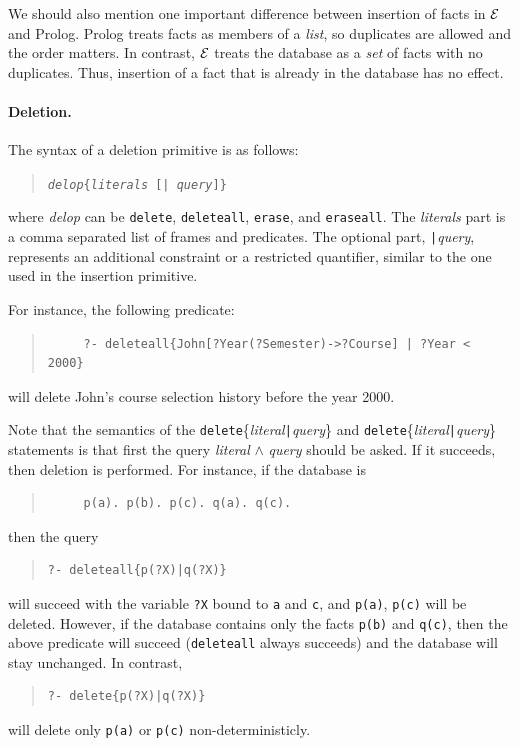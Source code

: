 \documentclass[11pt]{article}
\newcommand{\ERGO}{\mbox{\ensuremath{\cal{E}}\smaller{{\sc{RGO}}}}\xspace}
\newcommand{\FLSYSTEM}{\ERGO}
\begin{document}
We should also mention one important difference between insertion of facts
in \FLSYSTEM and Prolog. Prolog treats facts as members of a \emph{list}, so
duplicates are allowed and the order matters. In contrast, \FLSYSTEM treats
the database as a \emph{set} of facts with no duplicates. Thus, insertion
of a fact that is already in the database has no effect.


%
\paragraph{Deletion.} The syntax of a deletion primitive is as follows:
\begin{quote}
{\tt \emph{delop}\{\emph{literals} [| \emph{query}]\}}
\end{quote}
where {\it delop} can be {\tt delete}, {\tt deleteall}, {\tt erase}, and
{\tt eraseall}. The {\it literals} part is a comma separated list of
frames and predicates. The optional part, {\tt |}\emph{query},
represents an additional constraint or a restricted quantifier, similar
to the one used in the insertion primitive.

For instance, the following predicate:
\begin{quote}
\begin{verbatim}
     ?- deleteall{John[?Year(?Semester)->?Course] | ?Year < 2000}
\end{verbatim}
\end{quote}
will delete John's course selection history before the year 2000.

Note that the semantics of the {\tt delete}\{\emph{literal}{\tt |}{\it query}\}
and {\tt delete}\{\emph{literal}{\tt |}{\it query}\}
statements is that first the query \emph{literal} $\wedge$ \emph{query} should
be asked. If it succeeds, then deletion is performed. For instance, if the
database is
\begin{quote}
\begin{verbatim}
     p(a). p(b). p(c). q(a). q(c).
\end{verbatim}
\end{quote}
then the query
\begin{quote}
\begin{verbatim}
?- deleteall{p(?X)|q(?X)}
\end{verbatim}
\end{quote}
will succeed with the variable {\tt ?X} bound to {\tt a} and {\tt c}, and
{\tt p(a)}, {\tt p(c)} will be deleted.  However, if the database contains
only the facts {\tt p(b)} and {\tt q(c)}, then the above predicate will
succeed ({\tt deleteall} always succeeds) and the database will stay
unchanged. In contrast,
\begin{quote}
\begin{verbatim}
?- delete{p(?X)|q(?X)}
\end{verbatim}
\end{quote}
will delete only \texttt{p(a)} or \texttt{p(c)} non-deterministicly.  
\end{document}
